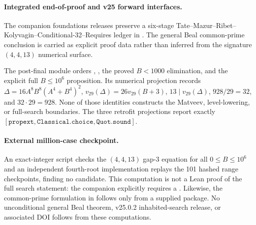 \paragraph{Integrated end-of-proof and v25 forward interfaces.}
The companion foundations releases preserve a six-stage
Tate--Mazur--Ribet--Kolyvagin--Conditional-32--Requires ledger in
. The general Beal common-prime conclusion is carried
as explicit proof data rather than inferred from the signature $(4,4,13)$
numerical surface.

The post-final module
 orders
, , the proved $B<1000$
elimination, and the explicit full $B\leq10^6$ proposition.
Its numerical projection records
$\Delta=16A^8B^8(A^4+B^4)^2$,
$v_{29}(\Delta)=26v_{29}(B+3)$,
$13\mid v_{29}(\Delta)$, $928/29=32$, and $32\cdot29=928$.
None of those identities constructs the Matveev, level-lowering, or
full-search boundaries. The three retrofit projections report exactly
$[\mathtt{propext},\mathtt{Classical.choice},\mathtt{Quot.sound}]$.

\paragraph{External million-case checkpoint.}
An exact-integer script checks the $(4,4,13)$ gap-3 equation for all
$0\leq B\leq10^6$ and an independent fourth-root implementation
replays the 101 hashed range checkpoints, finding no candidate.
This computation is not a Lean proof of the full search statement:
the companion  explicitly requires a
. Likewise, the common-prime formulation in
 follows only from a supplied
 package. No unconditional general Beal
theorem, v25.0.2 inhabited-search release, or associated DOI follows
from these computations.

